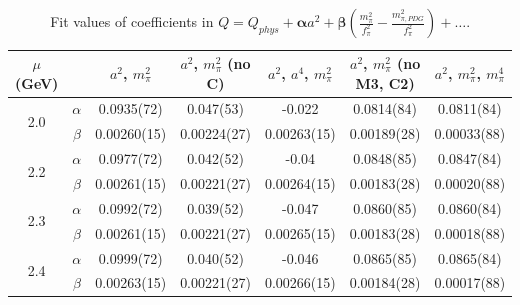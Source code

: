 \documentclass[12pt]{extarticle}
\begin{document}
\begin{table}[h!]
\begin{center}
\begin{tabular}{|c c|c|c|c|c|c|}
\hline
$\mu$ (GeV) &  & $a^2$, $m_\pi^2$& $a^2$, $m_\pi^2$ (no C)& $a^2$, $a^4$, $m_\pi^2$& $a^2$, $m_\pi^2$ (no M3, C2)& $a^2$, $m_\pi^2$, $m_\pi^4$\\
\hline
\multirow{2}{0.5in}{2.0} & $\alpha$ & 0.0935(72)& 0.047(53)& -0.022& 0.0814(84)& 0.0811(84)\\
 & $\beta$ & 0.00260(15)& 0.00224(27)& 0.00263(15)& 0.00189(28)& 0.00033(88)\\
\hline
\multirow{2}{0.5in}{2.2} & $\alpha$ & 0.0977(72)& 0.042(52)& -0.04& 0.0848(85)& 0.0847(84)\\
 & $\beta$ & 0.00261(15)& 0.00221(27)& 0.00264(15)& 0.00183(28)& 0.00020(88)\\
\hline
\multirow{2}{0.5in}{2.3} & $\alpha$ & 0.0992(72)& 0.039(52)& -0.047& 0.0860(85)& 0.0860(84)\\
 & $\beta$ & 0.00261(15)& 0.00221(27)& 0.00265(15)& 0.00183(28)& 0.00018(88)\\
\hline
\multirow{2}{0.5in}{2.4} & $\alpha$ & 0.0999(72)& 0.040(52)& -0.046& 0.0865(85)& 0.0865(84)\\
 & $\beta$ & 0.00263(15)& 0.00221(27)& 0.00266(15)& 0.00184(28)& 0.00017(88)\\
\hline
\end{tabular}
\caption{Fit values of coefficients in $Q = Q_{phys} + \mathbf{\alpha} a^2 + \mathbf{\beta}\left(\frac{m_\pi^2}{f_\pi^2}-\frac{m_{\pi,PDG}^2}{f_\pi^2}\right) + \ldots$.}
\end{center}
\end{table}




















\clearpage
\end{document}
